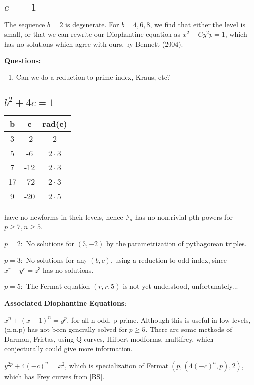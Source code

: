 \documentclass[12pt]{article}
\newcommand{\rad}{\rm rad}
\begin{document}
\subsection{$c=-1$}

The sequence $b=2$ is degenerate.
For $b=4,6,8$, we find that either the level is small, or that we can rewrite our Diophantine equation as $x^2 - C y^2p = 1$, which has no solutions which agree with ours, by Bennett (2004).

\textbf{Questions:}
\begin{enumerate}
\item Can we do a reduction to prime index, Kraus, etc?
\end{enumerate}


\subsection{$b^2 + 4c = 1$}
\begin{center}
\begin{tabular}{c c c}
b & c & \rad(c) \\ \hline \hline
3 & -2 & 2  \\
5 & -6 & $2\cdot$3  \\
7 & -12 & $2\cdot$3  \\
17 & -72 & $2\cdot$3 \\
9 & -20 & $2\cdot$5
\end{tabular}
\end{center}
have no newforms in their levels, hence $F_n$ has no nontrivial pth powers for $p \geq 7, n \geq 5$.

$p=2:$ No solutions for $(3,-2)$ by the parametrization of pythagorean triples.

$p=3:$ No solutions for any $(b,c)$, using a reduction to odd index, since $x^r+y^r=z^3$ has no solutions.

$p=5:$ The Fermat equation $(r,r,5)$ is not yet understood, unfortunately...

\textbf{Associated Diophantine Equations}:

$x^n + (x-1)^n = y^p$, for all n odd, p prime. Although this is useful in low levels, (n,n,p) has not been generally solved for $p \geq 5$. There are some methods of Darmon, Frietas, using Q-curves, Hilbert modforms, multifrey, which conjecturally could give more information.

$y^{2p} + 4(-c)^n = x^2$, which is specialization of Fermat $(p, (4(-c)^n, p), 2)$, which has Frey curves from [BS].
\end{document}
